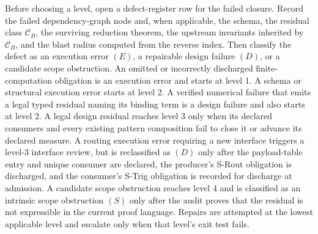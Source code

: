 \documentclass[
  11pt,
]{article}
\theoremstyle{definition}
\begin{document}
Before choosing a level, open a defect-register row for the failed
closure. Record the failed dependency-graph node and, when applicable,
the schema, the
residual class \(\mathcal C_B\), the surviving reduction theorem, the
upstream invariants inherited by \(\mathcal C_B\), and the blast radius
computed from the reverse index. Then classify the defect as an
execution error \((E)\), a repairable design failure \((D)\), or a
candidate scope obstruction. An omitted or incorrectly discharged
finite-computation obligation is an execution error and starts at level
1. A schema or structural execution error starts at level 2. A verified
numerical failure that emits a legal typed residual naming its binding
term is a design failure and also starts at level 2. A legal design
residual reaches level 3 only when its declared consumers and every
existing pattern composition fail to close it or advance its declared
measure. A routing execution error requiring a new interface triggers a
level-3 interface review, but is reclassified as \((D)\) only after the
payload-table entry and unique consumer are declared, the producer's
S-Rout obligation is discharged, and the consumer's S-Trig obligation is
recorded for discharge at admission. A candidate scope obstruction
reaches level 4 and is classified as an
intrinsic scope obstruction \((S)\) only after the audit proves that the
residual is not expressible in the current proof language. Repairs are
attempted at the lowest applicable level and escalate only when that
level's exit test fails.
\end{document}
